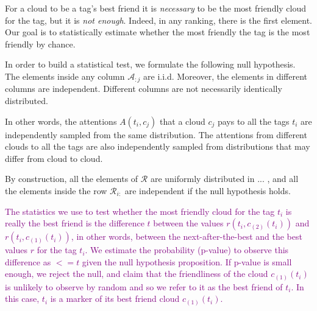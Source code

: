\documentclass{llncs}
\begin{document}
For a cloud to be a tag's best friend it is \textit{necessary} to be the most friendly cloud for the tag, but it is \textit{not enough}. Indeed, in any ranking, there is the first element. Our goal is to statistically estimate whether the most friendly the tag is the most friendly by chance. 

In order to build a statistical test, we formulate the following null hypothesis. The elements inside any column $\mathcal{A}_{:j}$ are i.i.d. Moreover, the elements in different columns are independent. Different columns are not necessarily identically distributed.

In other words, the attentions $A(t_i, c_j)$ that a cloud $c_j$ pays to all the tags $t_i$ are independently sampled from the same distribution. The attentions from different clouds to all the tags are also independently sampled from distributions that may differ from cloud to cloud.

By construction, all the elements of $\mathcal{R}$ are uniformly distributed in ... , and all the elements inside the row $\mathcal{R}_{i:}$ are independent if the null hypothesis holds.

\textcolor{purple}{ 
The statistics we use to test whether the most friendly cloud for the tag $t_i$ is really the best friend is the difference $t$ between the values $r(t_i,c_{(2)}(t_i))$ and $r(t_i,c_{(1)}(t_i))$, in other words, between the next-after-the-best and the best values $r$ for the tag $t_i$. We estimate the probability (p-value) to observe this difference as $<=t$ given the null hypothesis proposition. If p-value is small enough, we reject the null, and claim that the friendliness of the cloud $c_{(1)}(t_i)$ is unlikely to observe by random and so we refer to it as the best friend of $t_i$. In this case, $t_i$ is a marker of its best friend cloud $c_{(1)}(t_i)$.
}
\end{document}
